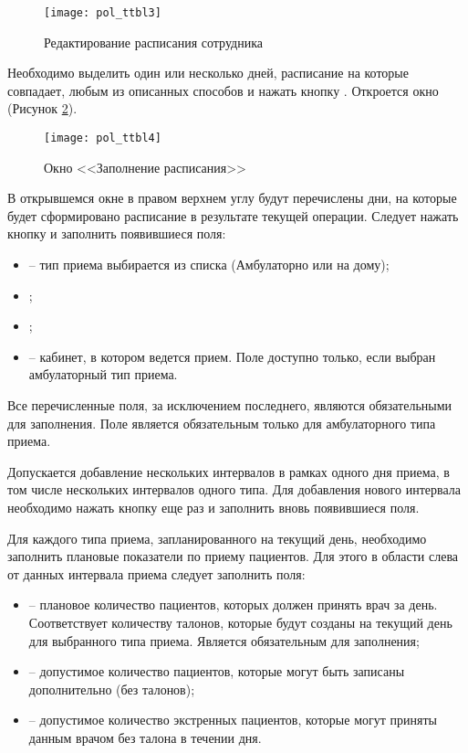 \begin{figure}[ht]\centering
 \texttt{[image: pol\_ttbl3]}
 \caption{Редактирование расписания сотрудника}
 \label{img_pol_ttbl3}
\end{figure}

Необходимо выделить один или несколько дней, расписание на которые совпадает, любым из описанных способов и нажать кнопку . Откроется окно  (Рисунок \ref{img_pol_ttbl4}). 

\begin{figure}[ht]\centering
 \texttt{[image: pol\_ttbl4]}
 \caption{Окно <<Заполнение расписания>>}
 \label{img_pol_ttbl4}
\end{figure}

В открывшемся окне в правом верхнем углу будут перечислены дни, на которые будет сформировано расписание в результате текущей операции. Следует нажать кнопку  и заполнить появившиеся поля:
\begin{itemize}
 \item {} -- тип приема выбирается из списка (Амбулаторно или на дому);
 \item {};
 \item {};
 \item {} -- кабинет, в котором ведется прием. Поле доступно только, если выбран амбулаторный тип приема.
\end{itemize}
Все перечисленные поля, за исключением последнего, являются обязательными для заполнения.  Поле  является обязательным только для амбулаторного типа приема.

Допускается добавление нескольких интервалов в рамках одного дня приема, в том числе нескольких интервалов одного типа. Для добавления нового интервала необходимо нажать кнопку  еще раз и заполнить вновь появившиеся поля.

Для каждого типа приема, запланированного на текущий день, необходимо заполнить плановые показатели по приему пациентов. Для этого в области слева от данных интервала приема следует заполнить поля:
\begin{itemize}
 \item {} -- плановое количество пациентов, которых должен принять врач за день. Соответствует количеству талонов, которые будут созданы на текущий день для выбранного типа приема. Является обязательным для заполнения;
 \item {} -- допустимое количество пациентов, которые могут быть записаны дополнительно (без талонов);
 \item {} -- допустимое количество экстренных пациентов, которые могут приняты данным врачом без талона в течении дня.
\end{itemize}

